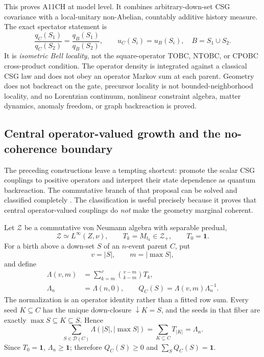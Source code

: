 This proves A11CH at model level.  It combines arbitrary-down-set CSG
covariance with a local-unitary non-Abelian, countably additive history
measure.  The exact spectator statement is
\begin{equation}
 \frac{q_C(S_1)}{q_C(S_2)}
 =\frac{q_B(S_1)}{q_B(S_2)},\qquad
 u_C(S_i)=u_B(S_i),
 \quad B=S_1\cup S_2.
 \label{eq:cnh-isometric-bell}
\end{equation}
It is \emph{isometric Bell locality}, not the square-operator TOBC, NTOBC,
or CPOBC cross-product condition.  The operator density is integrated
against a classical CSG law and does not obey an operator Markov sum at each
parent.  Geometry does not backreact on the gate, precursor locality is not
bounded-neighborhood locality, and no Lorentzian continuum, nonlinear
constraint algebra, matter dynamics, anomaly freedom, or graph backreaction
is proved.

\subsection{Central operator-valued growth and the no-coherence boundary}
\label{sec:central-operator-growth}

The preceding constructions leave a tempting shortcut: promote the scalar
CSG couplings to positive operators and interpret their state dependence as
quantum backreaction.  The commutative branch of that proposal can be solved
and classified completely \cite{XuOperatorValuedCausalGrowth2026}.  The
classification is useful precisely because it proves that central
operator-valued couplings do \emph{not} make the geometry marginal
coherent.

Let \(\mathcal Z\) be a commutative von Neumann algebra with separable
predual,
\[
 \mathcal Z\simeq L^\infty(Z,\nu),
 \qquad T_k=M_{t_k}\in\mathcal Z_+,\qquad T_0=\mathbf1 .
\]
For a birth above a down-set \(S\) of an \(n\)-event parent \(C\), put
\[
 v=|S|,\qquad m=|\max S|,
\]
and define
\begin{align}
 \Lambda(v,m)
 &=\sum_{k=m}^{v}\binom{v-m}{k-m}T_k,\nonumber\\
 \Lambda_n&=\Lambda(n,0),\qquad
 Q_C(S)=\Lambda(v,m)\Lambda_n^{-1}.
 \label{eq:ocg-transition}
\end{align}
The normalization is an operator identity rather than a fitted row sum.
Every seed \(K\subseteq C\) has the unique down-closure
\(\downarrow K=S\), and the seeds in that fiber are exactly
\(\max S\subseteq K\subseteq S\).  Hence
\begin{equation}
 \sum_{S\in\mathcal D(C)}
 \Lambda(|S|,|\max S|)
 =\sum_{K\subseteq C}T_{|K|}
 =\Lambda_n .
 \label{eq:ocg-seed-identity}
\end{equation}
Since \(T_0=\mathbf1\), \(\Lambda_n\geq\mathbf1\); therefore
\(Q_C(S)\geq0\) and \(\sum_SQ_C(S)=\mathbf1\).

